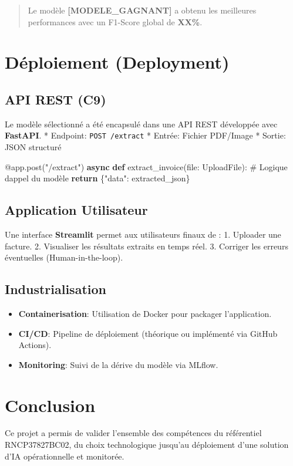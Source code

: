 \documentclass[
  letterpaper,
  DIV=11,
  numbers=noendperiod]{scrartcl}
\newenvironment{Shaded}{\begin{snugshade}}{\end{snugshade}}
\newcommand{\AttributeTok}[1]{\textcolor[rgb]{0.40,0.45,0.13}{#1}}
\newcommand{\BuiltInTok}[1]{\textcolor[rgb]{0.00,0.23,0.31}{#1}}
\newcommand{\CommentTok}[1]{\textcolor[rgb]{0.37,0.37,0.37}{#1}}
\newcommand{\ControlFlowTok}[1]{\textcolor[rgb]{0.00,0.23,0.31}{\textbf{#1}}}
\newcommand{\KeywordTok}[1]{\textcolor[rgb]{0.00,0.23,0.31}{\textbf{#1}}}
\newcommand{\NormalTok}[1]{\textcolor[rgb]{0.00,0.23,0.31}{#1}}
\newcommand{\StringTok}[1]{\textcolor[rgb]{0.13,0.47,0.30}{#1}}
\providecommand{\tightlist}{%
  \setlength{\itemsep}{0pt}\setlength{\parskip}{0pt}}
\begin{document}
\begin{quote}
Le modèle \textbf{{[}MODELE\_GAGNANT{]}} a obtenu les meilleures
performances avec un F1-Score global de \textbf{XX\%}.
\end{quote}

\section{Déploiement (Deployment)}\label{duxe9ploiement-deployment}

\subsection{API REST (C9)}\label{api-rest-c9}

Le modèle sélectionné a été encapsulé dans une API REST développée avec
\textbf{FastAPI}. * Endpoint: \texttt{POST\ /extract} * Entrée: Fichier
PDF/Image * Sortie: JSON structuré

\begin{Shaded}
\begin{Highlighting}[]
\AttributeTok{@app.post}\NormalTok{(}\StringTok{"/extract"}\NormalTok{)}
\ControlFlowTok{async} \KeywordTok{def}\NormalTok{ extract\_invoice(}\BuiltInTok{file}\NormalTok{: UploadFile):}
    \CommentTok{\# Logique d\textquotesingle{}appel du modèle}
    \ControlFlowTok{return}\NormalTok{ \{}\StringTok{"data"}\NormalTok{: extracted\_json\}}
\end{Highlighting}
\end{Shaded}

\subsection{Application Utilisateur}\label{application-utilisateur}

Une interface \textbf{Streamlit} permet aux utilisateurs finaux de : 1.
Uploader une facture. 2. Visualiser les résultats extraits en temps
réel. 3. Corriger les erreurs éventuelles (Human-in-the-loop).

\subsection{Industrialisation}\label{industrialisation}

\begin{itemize}
\tightlist
\item
  \textbf{Containerisation}: Utilisation de Docker pour packager
  l'application.
\item
  \textbf{CI/CD}: Pipeline de déploiement (théorique ou implémenté via
  GitHub Actions).
\item
  \textbf{Monitoring}: Suivi de la dérive du modèle via MLflow.
\end{itemize}

\section{Conclusion}\label{conclusion}

Ce projet a permis de valider l'ensemble des compétences du référentiel
RNCP37827BC02, du choix technologique jusqu'au déploiement d'une
solution d'IA opérationnelle et monitorée.
\end{document}
